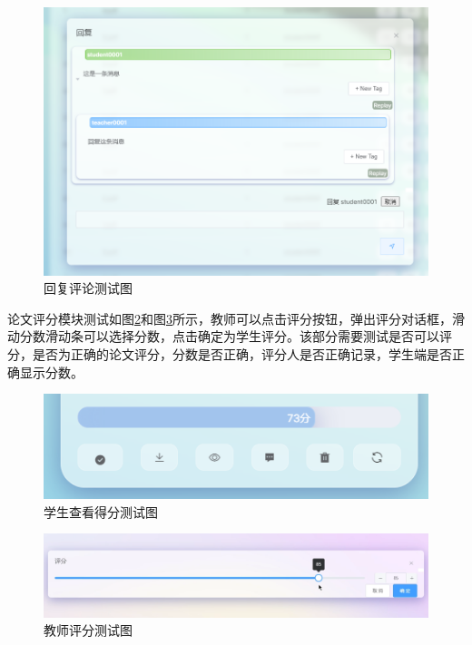 \begin{figure}
  \centering
  \includegraphics[scale = 0.6]{out/figure/测试/comment-replay.png}
  \caption{\song\wuhao 回复评论测试图}
  \label{comment-replay}
\end{figure}

论文评分模块测试如图\ref{score-student}和图\ref{score-teacher}所示，教师可以点击评分按钮，弹出评分对话框，滑动分数滑动条可以选择分数，点击确定为学生评分。该部分需要测试是否可以评分，是否为正确的论文评分，分数是否正确，评分人是否正确记录，学生端是否正确显示分数。

\begin{figure}[htbp]
  \centering
  \includegraphics[scale = 0.6]{out/figure/测试/score-student.png}
  \caption{\song\wuhao 学生查看得分测试图}
  \label{score-student}
\end{figure}

\begin{figure}[htbp]
  \centering
  \includegraphics[scale = 0.6]{out/figure/测试/score-teacher.png}
  \caption{\song\wuhao 教师评分测试图}
  \label{score-teacher}
\end{figure}

